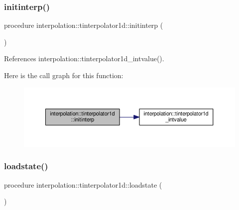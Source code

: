 \subsubsection{\texorpdfstring{initinterp()}{initinterp()}}
{\footnotesize\ttfamily procedure interpolation\+::tinterpolator1d\+::initinterp (\begin{DoxyParamCaption}{ }\end{DoxyParamCaption})}



References interpolation\+::tinterpolator1d\+\_\+intvalue().

Here is the call graph for this function\+:
\nopagebreak
\begin{figure}[H]
\begin{center}
\leavevmode
\includegraphics[width=350pt]{structinterpolation_1_1tinterpolator1d_acbc4b887acf64342c64ade922c1447ad_cgraph}
\end{center}
\end{figure}
\mbox{\label{structinterpolation_1_1tinterpolator1d_a4ebef5573d1b7bbcb512e482961dfc43}} 
\subsubsection{\texorpdfstring{loadstate()}{loadstate()}}
{\footnotesize\ttfamily procedure interpolation\+::tinterpolator1d\+::loadstate (\begin{DoxyParamCaption}{ }\end{DoxyParamCaption})}

\mbox{\label{structinterpolation_1_1tinterpolator1d_a3062dd1ef35bcc32d4f595f19b06c95b}} 
